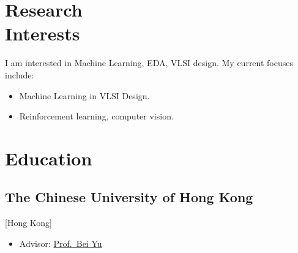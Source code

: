 \documentclass{mycv}
\begin{document}
\maketitle%

\section{Research \\ Interests}

I am interested in Machine Learning, EDA, VLSI design. My current focuses include:

\begin{itemize}
  \item Machine Learning in VLSI Design.
  \item Reinforcement learning, computer vision.
\end{itemize}



\section{Education}

\subsection{The Chinese University of Hong Kong}[Hong Kong]

\begin{positions}
\end{positions}
\vspace{-\parskip}%
\begin{itemize}
  \item Advisor: \href{http://www.cse.cuhk.edu.hk/~byu/}{Prof.~Bei Yu}
\end{itemize}
\end{document}
